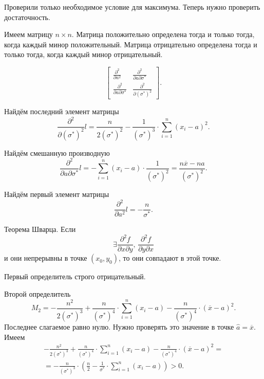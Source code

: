 Проверили только необходимое условие для максимума.
Теперь нужно проверить достаточность.

Имеем матрицу $n \times n$.
Матрица положительно определена тогда и только тогда, когда каждый минор положительный.
Матрица отрицательно определена тогда и только тогда, когда каждый минор отрицательный.

$$ \begin{bmatrix}
  \frac{ \partial^2}{ \partial a^2} & \frac{ \partial^2}{ \partial a \partial \sigma^*} \\
  \frac{ \partial^2}{ \partial a \partial \sigma^*} & \frac{ \partial^2}{ \partial \left( \sigma^* \right)^2}
\end{bmatrix}.$$

Найдём последний элемент матрицы
$$ \frac{ \partial^2}{ \partial \left( \sigma^* \right)^2} l =
  \frac{n}{2 \left( \sigma^* \right)^2} -
  \frac{1}{ \left( \sigma^* \right)^3} \cdot \sum \limits_{i = 1}^n \left( x_i - a \right)^2.$$

Найдём смешанную производную
$$ \frac{ \partial^2}{ \partial a \partial \sigma^*} l =
  - \sum \limits_{i = 1}^n \left( x_i - a \right) \cdot \frac{1}{ \left( \sigma^* \right)^2} =
  \frac{n \overline{x} - na}{ \left( \sigma^* \right)^2}.$$

Найдём первый элемент матрицы
$$ \frac{ \partial^2}{ \partial a^2} l =
  - \frac{n}{ \sigma^*}.$$

Теорема Шварца.
Если
$$ \exists \frac{ \partial^2 f}{ \partial x \partial y}, \,
  \frac{ \partial^2 f}{ \partial y \partial x}$$
и они непрерывны в точке $ \left( x_0, y_0 \right) $, то они совпадают в этой точке.

Первый определитель строго отрицательный.

Второй определитель
$$M_2 =
  - \frac{n^2}{2 \left( \sigma^* \right)^3} +
  \frac{n}{ \left( \sigma^* \right)^4} \cdot \sum \limits_{i = 1}^n \left( x_i - a \right) -
  \frac{n}{ \left( \sigma^* \right)^4} \cdot \left( \overline{x} - a \right)^2.$$
Последнее слагаемое равно нулю.
Нужно проверять это значение в точке $ \hat{a} = \overline{x}$.
Имеем
\begin{equation*}
  \begin{split}
    - \frac{n^2}{2 \left( \sigma^* \right)^3} +
    \frac{n}{ \left( \sigma^* \right)^4} \cdot \sum \limits_{i = 1}^n \left( x_i - a \right) -
    \frac{n}{ \left( \sigma^* \right)^4} \cdot \left( \overline{x} - a \right)^2 = \\
    = - \frac{n}{ \left( \sigma^* \right)^3} \cdot
    \left( \frac{n}{2} - \frac{1}{ \sigma^*} \cdot
    \sum \limits_{i = 1}^n \left( x_i - a \right) \right) >
    0.
  \end{split}
\end{equation*}

